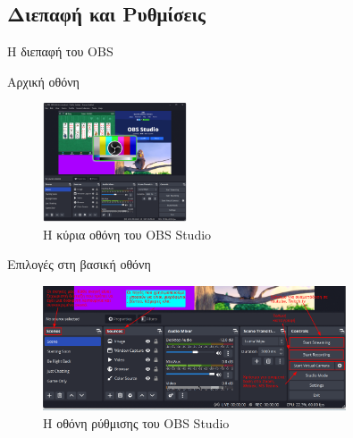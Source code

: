 \documentclass[aspectratio=169]{beamer}
\begin{document}
\subsection{Διεπαφή και Ρυθμίσεις}
\begin{frame}[allowframebreaks]{Η διεπαφή του OBS}
  \begin{block}{Αρχική οθόνη}
    \begin{figure}
      \includegraphics[width=0.38\textwidth]{images/screenshot_obs.png}
      \caption{Η κύρια οθόνη του OBS Studio}
      \label{fig:obs_interface}
    \end{figure}
  \end{block}
  \begin{block}{Επιλογές στη βασική οθόνη}
    \begin{figure}
      \includegraphics[width=0.8\textwidth]{images/obs_tools.png}
      \caption{Η οθόνη ρύθμισης του OBS Studio}
      \label{fig:obs_interface2}
    \end{figure}
  \end{block}
\end{frame}
\end{document}
